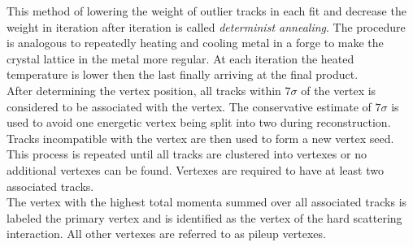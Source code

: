 \indent This method of lowering the weight of outlier tracks in each fit and decrease the weight in iteration after iteration is called {\it determinist annealing}. \cite{adaptiveFitting}  The procedure is analogous to repeatedly heating and cooling metal in a forge to make the crystal lattice in the metal more regular.  At each iteration the heated temperature is lower then the last finally arriving at the final product.  \\

\indent  After determining the vertex position, all tracks within $7\sigma$ of the vertex is considered to be associated with the vertex.  The conservative estimate of $7\sigma$ is used to avoid one energetic vertex being split into two during reconstruction.  Tracks incompatible with the vertex are then used to form a new vertex seed.  This process is repeated until all tracks are clustered into vertexes or no additional vertexes can be found.  Vertexes are required to have at least two associated tracks. \\

\indent The vertex with the highest total momenta summed over all associated tracks is labeled the primary vertex and is identified as the vertex of the hard scattering interaction.  All other vertexes are referred to as pileup vertexes.
